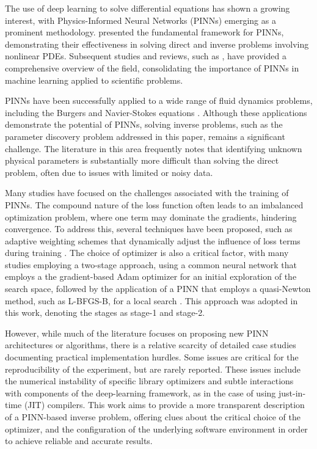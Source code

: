 \documentclass[12pt,fleqn]{article}
\begin{document}
The use of deep learning to solve differential equations has shown a growing interest, with Physics-Informed Neural Networks (PINNs) emerging as a prominent methodology. \cite{raissi2019} presented the fundamental framework for PINNs, demonstrating their effectiveness in solving direct and inverse problems involving nonlinear PDEs. Subsequent studies and reviews, such as \cite{cuomo2022}, have provided a comprehensive overview of the field, consolidating the importance of PINNs in machine learning applied to scientific problems.

PINNs have been successfully applied to a wide range of fluid dynamics problems, including the Burgers and Navier-Stokes equations \citep{raissi2019}. Although these applications demonstrate the potential of PINNs, solving inverse problems, such as the parameter discovery problem addressed in this paper, remains a significant challenge. The literature in this area frequently notes that identifying unknown physical parameters is substantially more difficult than solving the direct problem, often due to issues with limited or noisy data.

Many studies have focused on the challenges associated with the training of PINNs. The compound nature of the loss function often leads to an imbalanced optimization problem, where one term may dominate the gradients, hindering convergence. To address this, several techniques have been proposed, such as adaptive weighting schemes that dynamically adjust the influence of loss terms during training \citep{wang2021}. The choice of optimizer is also a critical factor, with many studies employing a two-stage approach, using a common neural network that employs a the gradient-based Adam optimizer for an initial exploration of the search space, followed by the application of a PINN that employs a quasi-Newton method, such as L-BFGS-B, for a local search \citep{wang2021}. This approach was adopted in this work, denoting the stages as stage-1 and stage-2.

However, while much of the literature focuses on proposing new PINN architectures or algorithms, there is a relative scarcity of detailed case studies documenting practical implementation hurdles. Some issues are critical for the reproducibility of the experiment, but are rarely reported. These issues include the numerical instability of specific library optimizers and subtle interactions with components of the deep-learning framework, as in the case of using just-in-time (JIT) compilers. This work aims to provide a more transparent description of a PINN-based inverse problem, offering clues about the critical choice of the optimizer, and the configuration of the underlying software environment in order to achieve reliable and accurate results.
\end{document}
